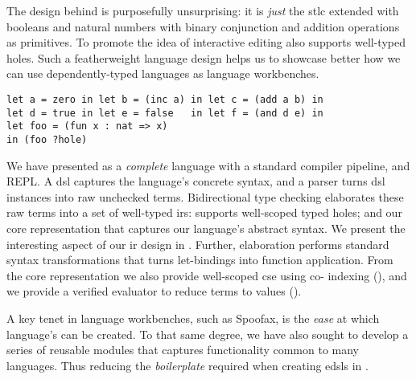 
The design behind \Velo{} is purposefully unsurprising:
%
it is \emph{just} the \ac{stlc} extended with booleans and natural numbers with binary conjunction and addition operations as primitives.
%
To promote the idea of interactive editing \Velo{} also supports well-typed holes.
%
Such a featherweight language design helps us to showcase better how we can use dependently-typed languages as language workbenches.


\begin{Verbatim}
let a = zero in let b = (inc a) in let c = (add a b) in
let d = true in let e = false   in let f = (and d e) in
let foo = (fun x : nat => x)
in (foo ?hole)
\end{Verbatim}

We have presented \Velo{} as a \emph{complete} language with a standard compiler pipeline, and REPL. %
%
A \ac{dsl} captures the language's concrete syntax, and a parser turns \ac{dsl} instances into raw unchecked terms.
%
Bidirectional type checking elaborates these raw terms into a set of well-typed \acp{ir}:
%
 supports well-scoped typed holes;
%
and
%
 our core representation that captures our language's abstract syntax.
%
We present the interesting aspect of our \ac{ir} design in .
%
Further, elaboration performs standard syntax transformations that turns let-bindings into function application.
%
From the core representation we also provide well-scoped \ac{cse} using co-\DeBruijn{} indexing (), and we provide a verified evaluator to reduce terms to values ().

A key tenet in language workbenches, such as Spoofax, is the \emph{ease} at which language's can be created.
To that same degree, we have also sought to develop a series of reusable modules that captures functionality common to many languages.
Thus reducing the \emph{boilerplate} required when creating \acp{edsl} in \Idris{}.


